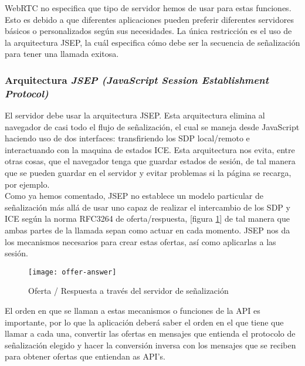 WebRTC no especifica que tipo de servidor hemos de usar para estas funciones. Esto es debido a que diferentes aplicaciones pueden preferir diferentes servidores básicos o personalizados según sus necesidades. La única restricción es el uso de la arquitectura JSEP, la cuál especifica cómo debe ser la secuencia de señalización para tener una llamada exitosa.

\subsubsection{Arquitectura \textit{JSEP (JavaScript Session Establishment Protocol)}}

El servidor debe usar la arquitectura JSEP. Esta arquitectura elimina al navegador de casi todo el flujo de señalización, el cual se maneja desde JavaScript haciendo uso de dos interfaces: transfiriendo los SDP local/remoto e interactuando con la maquina de estados ICE. Esta arquitectura nos evita, entre otras cosas, que el navegador tenga que guardar estados de sesión, de tal manera que se pueden guardar en el servidor y evitar problemas si la página se recarga, por ejemplo. \\

Como ya hemos comentado, JSEP no establece un modelo particular de señalización más allá de usar uno capaz de realizar el intercambio de los SDP y ICE según la norma RFC3264 de oferta/respuesta, [figura \ref{fig:oferta-respuesta}] de tal manera que ambas partes de la llamada sepan como actuar en cada momento. JSEP nos da los mecanismos necesarios para crear estas ofertas, así como aplicarlas a las sesión.\\

\begin{figure}[htb]
\centering
\texttt{[image: offer-answer]}
\caption{Oferta / Respuesta a través del servidor de señalización}
\label{fig:oferta-respuesta}
\end{figure}


El orden en que se llaman a estas mecanismos o funciones de la API es importante, por lo que la aplicación deberá saber el orden en el que tiene que llamar a cada una, convertir las ofertas en mensajes que entienda el protocolo de señalización elegido y hacer la conversión inversa con los mensajes que se reciben para obtener ofertas que entiendan as API's.\\

